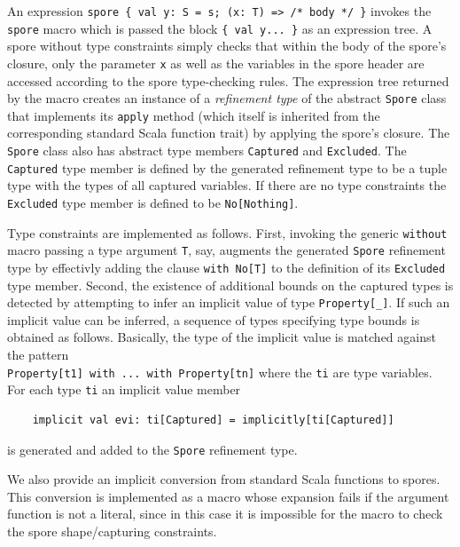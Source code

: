 \documentclass{llncs}
\begin{document}
An expression \verb|spore { val y: S = s; (x: T) => /* body */ }| invokes the \verb|spore| macro which is passed the block \verb|{ val y... }| as an expression tree. A spore without type constraints simply checks that within the body of the spore's closure, only the parameter \verb|x| as well as the variables in the spore header are accessed according to the spore type-checking rules. The expression tree returned by the macro creates an instance of a {\em refinement type} of the abstract \verb|Spore| class that implements its \verb|apply| method (which itself is inherited from the corresponding standard Scala function trait) by applying the spore's closure. The \verb|Spore| class also has abstract type members \verb|Captured| and \verb|Excluded|. The \verb|Captured| type member is defined by the generated refinement type to be a tuple type with the types of all captured variables. If there are no type constraints the \verb|Excluded| type member is defined to be \verb|No[Nothing]|.

Type constraints are implemented as follows. First, invoking the generic \verb|without| macro passing a type argument \verb|T|, say, augments the generated \verb|Spore| refinement type by effectivly adding the clause \verb|with No[T]| to the definition of its \verb|Excluded| type member. Second, the existence of additional bounds on the captured types is detected by attempting to infer an implicit value of type \verb|Property[_]|. If such an implicit value can be inferred, a sequence of types specifying type bounds is obtained as follows. Basically, the type of the implicit value is matched against the pattern \\ \verb|Property[t1] with ... with Property[tn]| where the \verb|ti| are type variables. For each type \verb|ti| an implicit value member

\begin{lstlisting}
    implicit val evi: ti[Captured] = implicitly[ti[Captured]]
\end{lstlisting}
\noindent
is generated and added to the \verb|Spore| refinement type.

We also provide an implicit conversion from standard Scala functions to spores. This conversion is implemented as a macro whose expansion fails if the argument function is not a literal, since in this case it is impossible for the macro to check the spore shape/capturing constraints.

\end{document}
